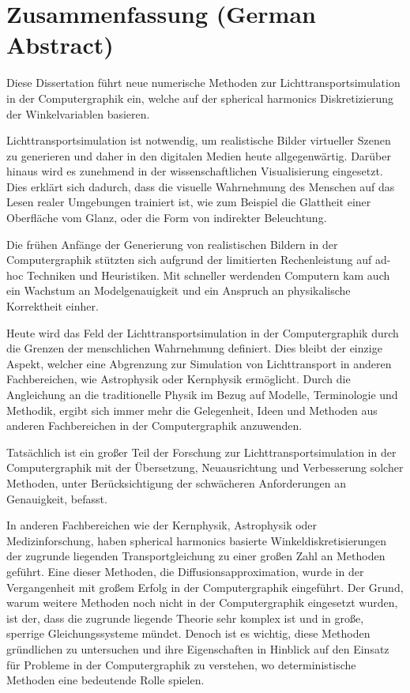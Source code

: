 %
\chapter*{Zusammenfassung (German Abstract)}
%
%
Diese Dissertation führt neue numerische Methoden zur Lichttransportsimulation in der Computergraphik ein, welche auf der spherical harmonics Diskretizierung der Winkelvariablen basieren.

Lichttransportsimulation ist notwendig, um realistische Bilder virtueller Szenen zu generieren und daher in den digitalen Medien heute allgegenwärtig. Darüber hinaus wird es zunehmend in der wissenschaftlichen Visualisierung eingesetzt. Dies erklärt sich dadurch, dass die visuelle Wahrnehmung des Menschen auf das Lesen realer Umgebungen trainiert ist, wie zum Beispiel die Glattheit einer Oberfläche vom Glanz, oder die Form von indirekter Beleuchtung.

Die frühen Anfänge der Generierung von realistischen Bildern in der Computergraphik stützten sich aufgrund der limitierten Rechenleistung auf ad-hoc Techniken und Heuristiken. Mit schneller werdenden Computern kam auch ein Wachstum an Modelgenauigkeit und ein Anspruch an physikalische Korrektheit einher.

Heute wird das Feld der Lichttransportsimulation in der Computergraphik durch die Grenzen der menschlichen Wahrnehmung definiert. Dies bleibt der einzige Aspekt, welcher eine Abgrenzung zur Simulation von Lichttransport in anderen Fachbereichen, wie Astrophysik oder Kernphysik ermöglicht. Durch die Angleichung an die traditionelle Physik im Bezug auf Modelle, Terminologie und Methodik, ergibt sich immer mehr die Gelegenheit, Ideen und Methoden aus anderen Fachbereichen in der Computergraphik anzuwenden.

Tatsächlich ist ein großer Teil der Forschung zur Lichttransportsimulation in der Computergraphik mit der Übersetzung, Neuausrichtung und Verbesserung solcher Methoden, unter Berücksichtigung der schwächeren Anforderungen an Genauigkeit, befasst.

In anderen Fachbereichen wie der Kernphysik, Astrophysik oder Medizinforschung, haben spherical harmonics basierte Winkeldiskretisierungen der zugrunde liegenden Transportgleichung zu einer großen Zahl an Methoden geführt. Eine dieser Methoden, die Diffusionsapproximation, wurde in der Vergangenheit mit großem Erfolg in der Computergraphik eingeführt. Der Grund, warum weitere Methoden noch nicht in der Computergraphik eingesetzt wurden, ist der, dass die zugrunde liegende Theorie sehr komplex ist und in große, sperrige Gleichungssysteme mündet. Denoch ist es wichtig, diese Methoden gründlichen zu untersuchen und ihre Eigenschaften in Hinblick auf den Einsatz für Probleme in der Computergraphik zu verstehen, wo deterministische Methoden eine bedeutende Rolle spielen.

